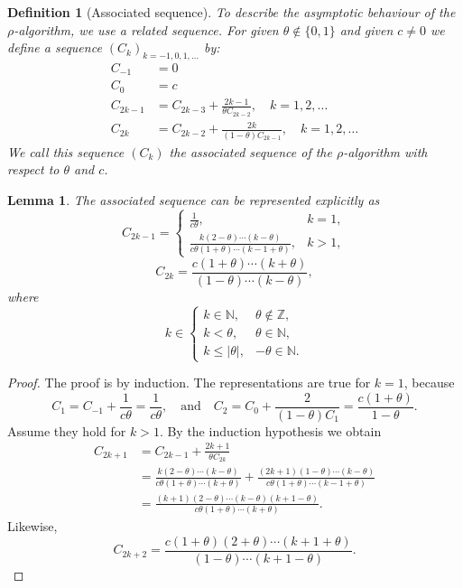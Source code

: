 \documentclass[a4paper,12pt]{article}
\numberwithin{equation}{section}
\newtheorem{lemma}[satz]{Lemma}
\newtheorem{definition}[satz]{Definition}
\theoremstyle{remark}
\begin{document}
\begin{definition}[Associated sequence]\label{subsec:assoz}
\textnormal{To describe the asymptotic behaviour of the $\rho$-algorithm, we use a related sequence.} For given $\theta \notin \big\{0,1\big\}$ and given $c \ne 0$ we define a sequence $(C_k)_{k=-1,0,1,\dots}$ by:
\begin{align*}
C_{-1} &= 0 \\
C_0 &= c \\
C_{2k-1} &= C_{2k-3} + \frac{2k - 1}{\theta C_{2k-2}}, \quad k = 1, 2, \dots\\
C_{2k} &= C_{2k-2} + \frac{2k}{(1 - \theta) C_{2k-1}}, \quad k = 1, 2, \dots
\end{align*}
We call this sequence $(C_k)$ the associated sequence of the $\rho$-algorithm with respect to $\theta$ and $c$.
\end{definition}

\begin{lemma}\label{lemma}
The associated sequence can be represented explicitly as
\[
C_{2k-1} =
\begin{cases}
\frac{1}{c\theta}, & k = 1, \\
\frac{k(2-\theta)\cdots(k-\theta)}{c\theta(1+\theta)\cdots(k-1+\theta)}, & k > 1,
\end{cases}
\]
\[
C_{2k} = \frac{c(1+\theta)\cdots(k+\theta)}{(1-\theta)\cdots(k-\theta)},
\]
where
\[
k \in
\begin{cases}
k\in\mathbb{N}, & \theta \notin \mathbb{Z}, \\
k< \theta, & \theta \in \mathbb{N}, \\
k\leq |\theta|, & -\theta \in \mathbb{N}.
\end{cases}
\]
\end{lemma}

\begin{proof}
The proof is by induction. The representations are true for $k = 1$, because
\[
C_1 = C_{-1} + \frac{1}{c\theta} = \frac{1}{c\theta}, \quad \text{and} \quad
C_2 = C_0 + \frac{2}{(1-\theta)C_1} = \frac{c(1+\theta)}{1-\theta}.
\]
Assume they hold for $k > 1$. By the induction hypothesis we obtain
\begin{align*}
C_{2k+1} &= C_{2k-1} + \frac{2k + 1}{\theta C_{2k}} \\
&= \frac{k(2-\theta)\cdots(k-\theta)}{c\theta(1+\theta)\cdots(k+\theta)}
+ \frac{(2k+1)(1-\theta)\cdots(k-\theta)}{c\theta(1+\theta)\cdots(k-1+\theta)} \\
&= \frac{(k+1)(2-\theta)\cdots(k-\theta)(k+1-\theta)}{c\theta(1+\theta)\cdots(k+\theta)}.
\end{align*}
Likewise,
\[
C_{2k+2} = \frac{c(1+\theta)(2+\theta)\cdots(k+1+\theta)}{(1-\theta)\cdots(k+1-\theta)}.
\]

\end{proof}
\end{document}
